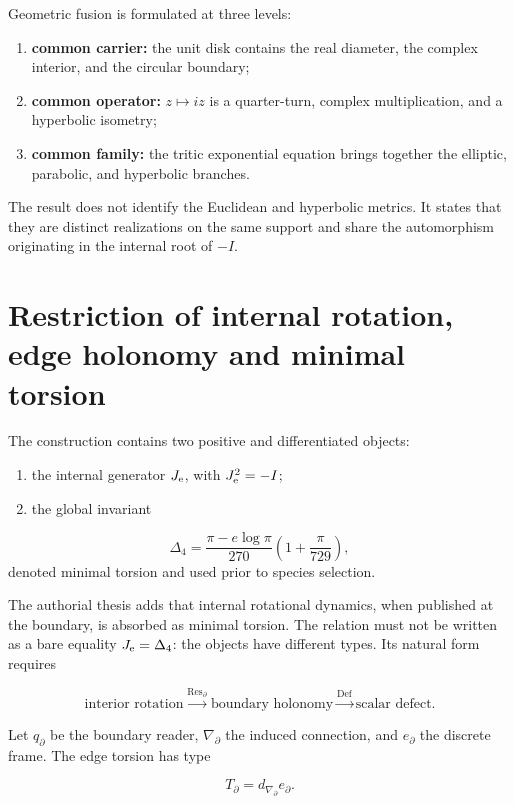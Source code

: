 Geometric fusion is formulated at three levels:

\begin{enumerate}
\item \textbf{common carrier:} the unit disk contains the real diameter, the complex interior, and the circular boundary;
\item \textbf{common operator:} \(z\mapsto iz\) is a quarter-turn, complex multiplication, and a hyperbolic isometry;
\item \textbf{common family:} the tritic exponential equation brings together the elliptic, parabolic, and hyperbolic branches.
\end{enumerate}

The result does not identify the Euclidean and hyperbolic metrics. It states
that they are distinct realizations on the same support and share the
automorphism originating in the internal root of \(-I\).


\section{Restriction of internal rotation, edge holonomy and minimal torsion}

The construction contains two positive and differentiated objects:

\begin{enumerate}
\item the internal generator \(J_{\rm e}\), with \(J_{\rm e}^2=-I\);
\item the global invariant
\end{enumerate}
   \[
   \Delta_4=
   \frac{\pi-e\log\pi}{270}
   \left(1+\frac{\pi}{729}\right),
   \]
   denoted minimal torsion and used prior to species selection.

The authorial thesis adds that internal rotational dynamics, when published
at the boundary, is absorbed as minimal torsion. The relation must not be
written as a bare equality \(J_{\rm e}=\Delta_4\): the objects have different types.
Its natural form requires

\[
\text{interior rotation}
\xrightarrow{\operatorname{Res}_{\partial}}
\text{boundary holonomy}
\xrightarrow{\operatorname{Def}}
\text{scalar defect}.
\]

Let \(q_\partial\) be the boundary reader, \(\nabla_\partial\) the induced connection, and \(e_\partial\) the discrete frame. The edge torsion has type

\[
T_\partial=d_{\nabla_\partial}e_\partial.
\]


